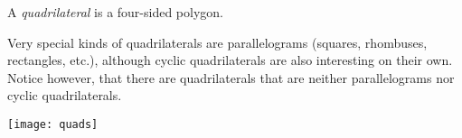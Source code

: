 \documentclass[12pt]{article}
\begin{document}
A \emph{quadrilateral} is a  four-sided polygon.


Very special kinds of quadrilaterals are parallelograms (squares, rhombuses, rectangles, etc.), although cyclic quadrilaterals are also interesting on their own.
Notice however, that there are quadrilaterals that are neither parallelograms nor cyclic quadrilaterals.

\begin{center}
\texttt{[image: quads]}
\end{center}
\end{document}

